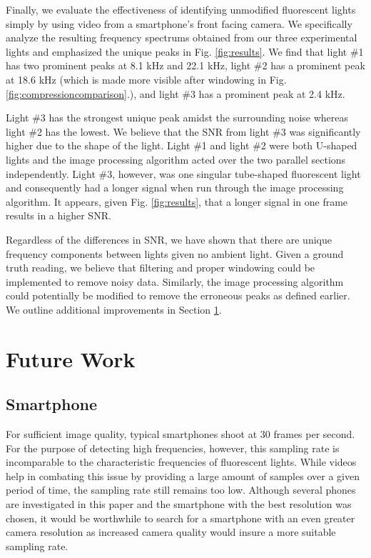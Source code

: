 \documentclass[conference]{IEEEtran}
\begin{document}
Finally, we evaluate the effectiveness of identifying unmodified fluorescent lights simply by using video from a smartphone's front facing camera. We specifically analyze the resulting frequency spectrums obtained from our three experimental lights and emphasized the unique peaks in Fig. \ref{fig:results}. We find that light \#1 has two prominent peaks at 8.1 kHz and 22.1 kHz, light \#2 has a prominent peak at 18.6 kHz (which is made more visible after windowing in Fig. \ref{fig:compressioncomparison}.), and light \#3 has a prominent peak at 2.4 kHz.

Light \#3 has the strongest unique peak amidst the surrounding noise whereas light \#2 has the lowest. We believe that the SNR from light \#3 was significantly higher due to the shape of the light. Light \#1 and light \#2 were both U-shaped lights and the image processing algorithm acted over the two parallel sections independently. Light \#3, however, was one singular tube-shaped fluorescent light and consequently had a longer signal when run through the image processing algorithm. It appears, given Fig. \ref{fig:results}, that a longer signal in one frame results in a higher SNR.

Regardless of the differences in SNR, we have shown that there are unique frequency components between lights given no ambient light. Given a ground truth reading, we believe that filtering and proper windowing could be implemented to remove noisy data. Similarly, the image processing algorithm could potentially be modified to remove the erroneous peaks as defined earlier. We outline additional improvements in Section \ref{section:futurework}.

\section{Future Work}\label{section:futurework}

\subsection{Smartphone}

For sufficient image quality, typical smartphones shoot at $30$ frames per second. For the purpose of detecting high frequencies, however, this sampling rate is incomparable to the characteristic frequencies of fluorescent lights. While videos help in combating this issue by providing a large amount of samples over a given period of time, the sampling rate still remains too low. Although several phones are investigated in this paper and the smartphone with the best resolution was chosen, it would be worthwhile to search for a smartphone with an even greater camera resolution as increased camera quality would insure a more suitable sampling rate.
\end{document}
